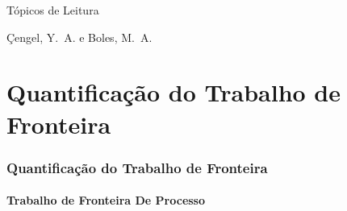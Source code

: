     \begin{frame}[allowframebreaks]{Tópicos de Leitura}
        \begin{thebibliography}{Çengel, Y.~A., 2013}
                Çengel, Y.~A. e Boles, M.~A.
        \end{thebibliography}
    \end{frame}


\part{Quantificação do Trabalho de Fronteira}
\frame{\partpage}

\section{Quantificação do Trabalho de Fronteira}

\subsection{Trabalho de Fronteira De Processo}

